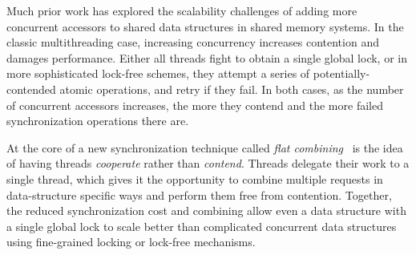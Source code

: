 Much prior work has explored the scalability challenges of adding more concurrent accessors to shared data structures in shared memory systems.
In the classic multithreading case, increasing concurrency increases contention and damages performance.
Either all threads fight to obtain a single global lock, or in more sophisticated lock-free schemes, they attempt a series of potentially-contended atomic operations, and retry if they fail. In both cases, as the number of concurrent accessors increases, the more they contend and the more failed synchronization operations there are.

At the core of a new synchronization technique called \emph{flat combining}~\cite{flatCombining} is the idea of having threads \emph{cooperate} rather than \emph{contend}.
Threads delegate their work to a single thread, which gives it the opportunity to combine multiple requests in data-structure specific ways and perform them free from contention.
Together, the reduced synchronization cost and combining allow even a data structure with a single global lock to scale better than complicated concurrent data structures using fine-grained locking or lock-free mechanisms.


